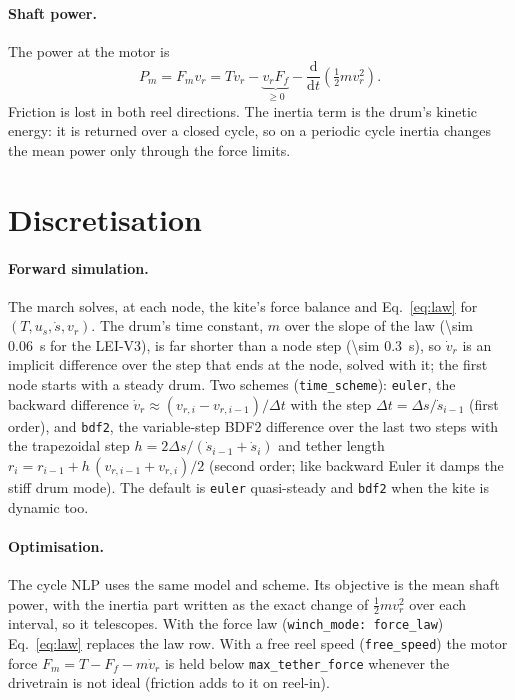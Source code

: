 \documentclass[11pt,a4paper]{article}
\newcommand{\code}[1]{\texttt{\small #1}}
\begin{document}
\paragraph{Shaft power.} The power at the motor is
\begin{equation}
  P_m = F_m v_r = T v_r - \underbrace{v_r F_f}_{\ge 0}
        - \frac{\mathrm{d}}{\mathrm{d}t}\!\left(\tfrac12 m v_r^2\right).
\end{equation}
Friction is lost in both reel directions. The inertia term is the drum's
kinetic energy: it is returned over a closed cycle, so on a periodic cycle
inertia changes the mean power only through the force limits.

\section{Discretisation}

\paragraph{Forward simulation.} The march solves, at each node, the kite's
force balance and Eq.~\eqref{eq:law} for $(T, u_s, \dot s, v_r)$. The drum's
time constant, $m$ over the slope of the law (\SI{\sim 0.06}{s} for the LEI-V3),
is far shorter than a node step (\SI{\sim 0.3}{s}), so $\dot v_r$ is an
implicit difference over the step that ends at the node, solved with it; the
first node starts with a steady drum. Two schemes (\code{time\_scheme}):
\code{euler}, the backward difference
$\dot v_r \approx (v_{r,i} - v_{r,i-1})/\Delta t$ with the step
$\Delta t = \Delta s/\dot s_{i-1}$ (first order), and \code{bdf2}, the
variable-step BDF2 difference over the last two steps with the trapezoidal step
$h = 2\Delta s/(\dot s_{i-1} + \dot s_i)$ and tether length
$r_i = r_{i-1} + h\,(v_{r,i-1} + v_{r,i})/2$ (second order; like backward Euler
it damps the stiff drum mode). The default is \code{euler} quasi-steady and
\code{bdf2} when the kite is dynamic too.

\paragraph{Optimisation.} The cycle NLP uses the same model and scheme. Its
objective is the mean shaft power, with the inertia part written as the exact
change of $\tfrac12 m v_r^2$ over each interval, so it telescopes. With the
force law (\code{winch\_mode: force\_law}) Eq.~\eqref{eq:law} replaces the law
row. With a free reel speed (\code{free\_speed}) the motor force
$F_m = T - F_f - m\dot v_r$ is held below \code{max\_tether\_force} whenever the
drivetrain is not ideal (friction adds to it on reel-in).
\end{document}
